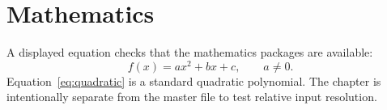 \section{Mathematics}\label{sec:math}
A displayed equation checks that the mathematics packages are available:
\begin{equation}\label{eq:quadratic}
  f(x)=ax^2+bx+c, \qquad a\ne0.
\end{equation}
Equation~\cref{eq:quadratic} is a standard quadratic polynomial. The chapter is intentionally separate from the master file to test relative input resolution.

